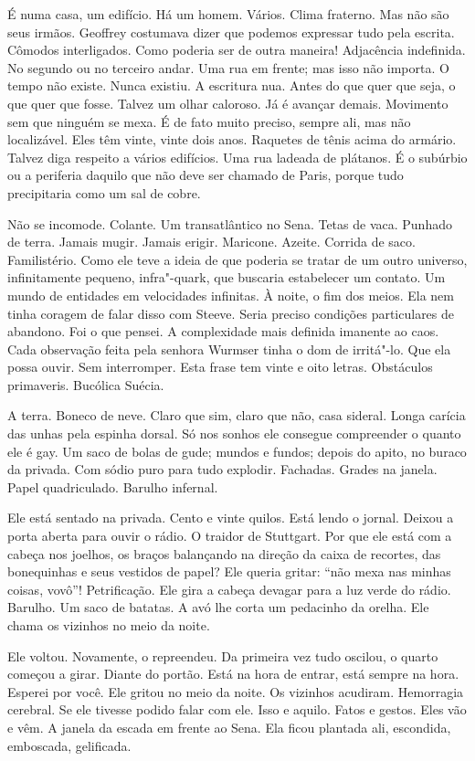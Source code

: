 É numa casa, um edifício. Há um homem. Vários. Clima fraterno. Mas não
são seus irmãos. Geoffrey costumava dizer que podemos expressar tudo
pela escrita. Cômodos interligados. Como poderia ser de outra maneira!
Adjacência indefinida. No segundo ou no terceiro andar. Uma rua em
frente; mas isso não importa. O tempo não existe. Nunca existiu. A
escritura nua. Antes do que quer que seja, o que quer que fosse. Talvez
um olhar caloroso. Já é avançar demais. Movimento sem que ninguém se
mexa. É de fato muito preciso, sempre ali, mas não localizável. Eles têm
vinte, vinte dois anos. Raquetes de tênis acima do armário. Talvez diga
respeito a vários edifícios. Uma rua ladeada de plátanos. É o subúrbio
ou a periferia daquilo que não deve ser chamado de Paris, porque tudo
precipitaria como um sal de cobre.

Não se incomode. Colante. Um transatlântico no Sena. Tetas de vaca.
Punhado de terra. Jamais mugir. Jamais erigir. Maricone. Azeite. Corrida
de saco. Familistério. Como ele teve a ideia de que poderia se tratar de
um outro universo, infinitamente pequeno, infra"-quark, que buscaria
estabelecer um contato. Um mundo de entidades em velocidades infinitas.
À noite, o fim dos meios. Ela nem tinha coragem de falar disso com
Steeve. Seria preciso condições particulares de abandono. Foi o que
pensei. A complexidade mais definida imanente ao caos. Cada observação
feita pela senhora Wurmser tinha o dom de irritá"-lo. Que ela possa
ouvir. Sem interromper. Esta frase tem vinte e oito letras. Obstáculos
primaveris. Bucólica Suécia.

A terra. Boneco de neve. Claro que sim, claro que não, casa sideral.
Longa carícia das unhas pela espinha dorsal. Só nos sonhos ele consegue
compreender o quanto ele é gay. Um saco de bolas de gude; mundos e
fundos; depois do apito, no buraco da privada. Com sódio puro para tudo
explodir. Fachadas. Grades na janela. Papel quadriculado. Barulho
infernal.

Ele está sentado na privada. Cento e vinte quilos. Está lendo o jornal.
Deixou a porta aberta para ouvir o rádio. O traidor de Stuttgart. Por
que ele está com a cabeça nos joelhos, os braços balançando na direção
da caixa de recortes, das bonequinhas e seus vestidos de papel? Ele
queria gritar: ``não mexa nas minhas coisas, vovô''! Petrificação. Ele
gira a cabeça devagar para a luz verde do rádio. Barulho. Um saco de
batatas. A avó lhe corta um pedacinho da orelha. Ele chama os vizinhos
no meio da noite.

Ele voltou. Novamente, o repreendeu. Da primeira vez tudo oscilou, o
quarto começou a girar. Diante do portão. Está na hora de entrar, está
sempre na hora. Esperei por você. Ele gritou no meio da noite. Os
vizinhos acudiram. Hemorragia cerebral. Se ele tivesse podido falar com
ele. Isso e aquilo. Fatos e gestos. Eles vão e vêm. A janela da escada
em frente ao Sena. Ela ficou plantada ali, escondida, emboscada,
gelificada.

